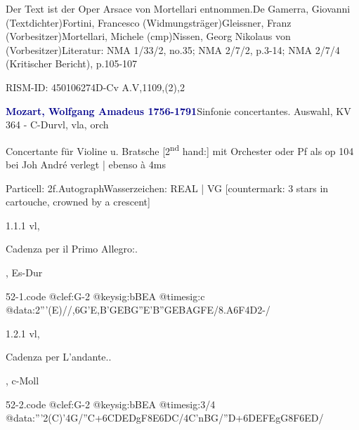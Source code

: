 \documentclass[a4paper, twocolumn, 11pt]{book}
\begin{document}
\newline %
\par Der Text ist der Oper Arsace von Mortellari entnommen.\newline De Gamerra, Giovanni  (Textdichter)\newline Fortini, Francesco  (Widmungsträger)\newline Gleissner, Franz  (Vorbesitzer)\newline Mortellari, Michele  (cmp)\newline Nissen, Georg Nikolaus von  (Vorbesitzer)\newline Literatur: NMA  1/33/2, no.35; NMA  2/7/2, p.3-14; NMA  2/7/4 (Kritischer Bericht), p.105-107
\par RISM-ID: 450106274\newline D-Cv  A.V,1109,(2),2
\par \vspace{16pt} \textcolor{darkblue}{\textbf{Mozart, Wolfgang Amadeus  1756-1791}}\hfillplus{[52]}\newline Sinfonie concertantes. Auswahl, KV 364 - C-Dur\newline vl, vla, orch
\par \begin{itshape} Concertante für Violine u. Bratsche [2\textsuperscript{n}\textsuperscript{d} hand:] mit Orchester oder Pf als op 104 bei Joh André verlegt | ebenso à 4ms\end{itshape} 
\par \textcolor{darkblue}{}  Particell: 2f.\newline Autograph\newline Wasserzeichen: REAL | VG [countermark: 3 stars in cartouche, crowned by a crescent]
\par 1.1.1  vl, \begin{itshape}Cadenza per il Primo Allegro:.\end{itshape}, Es-Dur  
\begin{filecontents*}{52-1.code}
@clef:G-2
@keysig:bBEA
@timesig:c
@data:2'''(E)//,{6G'E,B'G}{EBG''E}{'B''GEB}{AGFE}/{8.A6F}4D2-/
\end{filecontents*}

\newline %
\par 1.2.1  vl, \begin{itshape}Cadenza per L'andante..\end{itshape}, c-Moll  
\begin{filecontents*}{52-2.code}
@clef:G-2
@keysig:bBEA
@timesig:3/4
@data:'''2(C)'4G/''C+{6CDED}gF{8E6DC}/4C'nBG/''D+{6DEFE}gG{8F6ED}/
\end{filecontents*}
\end{document}

